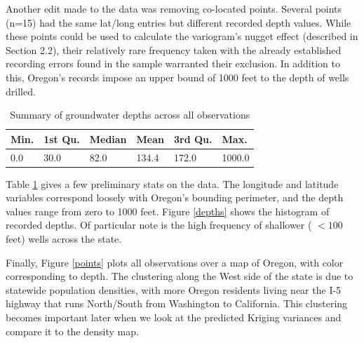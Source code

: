 \documentclass[12pt,twoside]{reedthesis}
\begin{document}
Another edit made to the data was removing co-located points. Several points (n=15) had the same lat/long entries but different recorded depth values. While these points could be used to calculate the variogram's nugget effect (described in Section 2.2), their relatively rare frequency taken with the already established recording errors found in the sample warranted their exclusion. In addition to this, Oregon's records impose an upper bound of 1000 feet to the depth of wells drilled.

\begin{table}[h]

	\centering
	

 \begin{tabular}{l|l|l|l|l|l}

\hline
Min. & 1st Qu. & Median & Mean & 3rd Qu. & Max. \\
\hline
0.0  & 30.0  & 82.0  & 134.4  & 172.0  & 1000.0  \\
\hline



\end{tabular}

\caption{Summary of groundwater depths across all observations}
\label{data}

\end{table}

Table \ref{data} gives a few preliminary stats on the data. The longitude and latitude variables correspond loosely with Oregon's bounding perimeter, and the depth values range from zero to 1000 feet. Figure \ref{depths} shows the histogram of recorded depths. Of particular note is the high frequency of shallower ( $<100$ feet) wells across the state. 

Finally, Figure \ref{points} plots all observations over a map of Oregon, with color corresponding to depth. The clustering along the West side of the state is due to statewide population densities, with more Oregon residents living near the I-5 highway that runs North/South from Washington to California. This clustering becomes important later when we look at the predicted Kriging variances and compare it to the density map.
\end{document}
